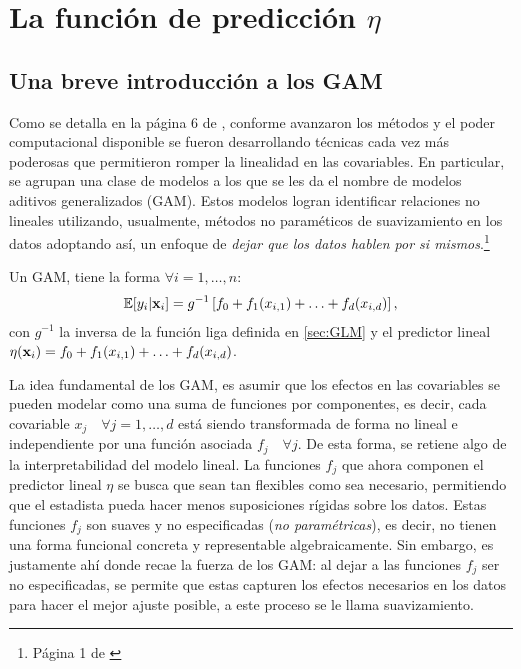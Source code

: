 \documentclass[../Main/Main.tex]{subfiles}
\begin{document}
\section{La función de predicción $\eta$} \label{sec:FuncPred} 
\subsection{Una breve introducción a los GAM}
Como se detalla en la página 6 de \citet{james2013introduction}, conforme avanzaron los métodos y el poder computacional disponible se fueron desarrollando técnicas cada vez más poderosas que permitieron romper la linealidad en las covariables. En particular, \citeauthor{hastie1990generalized} se agrupan una clase de modelos a los que se les da el nombre de modelos aditivos generalizados (GAM). Estos modelos logran identificar relaciones no lineales utilizando, usualmente, métodos no paraméticos de suavizamiento en los datos  adoptando así, un enfoque de \textit{dejar que los datos hablen por si mismos}.\footnote{Página 1 de \citet{hastie1990generalized}}\\

\begin{definition} \label{def:GAM}
Un GAM, tiene la forma $\forall i =1,\ldots,n$:
\begin{align}
	\mathbb{E}[y_i|\mathbf{x}_i] = g^{-1}\left[f_0 + f_1(x_{i,1}) + \ldots + f_d(x_{i,d})\right],\label{ec:GAM}
\end{align}
con $g^{-1}$ la inversa de la función liga definida en \eqref{sec:GLM} y el predictor lineal $\eta(\mathbf{x}_i) = f_0 + f_1(x_{i,1}) + \ldots + f_d(x_{i,d})$. 
\end{definition}

La idea fundamental de los GAM, es asumir que los efectos en las covariables se pueden modelar como una suma de funciones por componentes, es decir, cada covariable $x_j \quad \forall j =1,\ldots,d$ está siendo transformada de forma no lineal e independiente por una función asociada $f_j \quad \forall j$. De esta forma, se retiene algo de la interpretabilidad del modelo lineal. La funciones $f_j$ que ahora componen el predictor lineal $\eta$ se busca que sean tan flexibles como sea necesario, permitiendo que el estadista pueda hacer menos suposiciones rígidas sobre los datos. Estas funciones $f_j$ son suaves y no especificadas (\textit{no paramétricas}), es decir, no tienen una forma funcional concreta y representable algebraicamente. Sin embargo, es justamente ahí donde recae la fuerza de los GAM: al dejar a las funciones $f_j$ ser no especificadas, se permite que estas capturen los efectos necesarios en los datos para hacer el mejor ajuste posible, a este proceso se le llama suavizamiento. 
\end{document}
